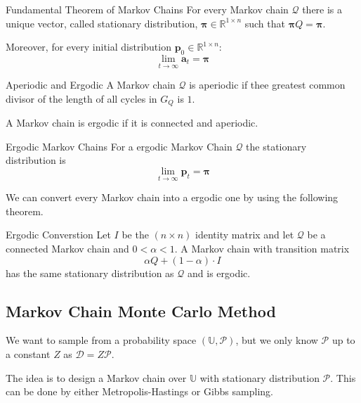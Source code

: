\documentclass{panikzettel}
\begin{document}
\begin{theo}{Fundamental Theorem of Markov Chains}
For every Markov chain $\mathcal{Q}$ there is a unique vector, called stationary distribution, $\boldsymbol{\pi} \in \mathbb{R}^{1 \times n}$ such that $\boldsymbol{\pi} Q = \boldsymbol{\pi}$.

Moreover, for every initial distribution $\textbf{p}_0 \in \mathbb{R}^{1 \times n}$:
$$
\lim_{t \rightarrow \infty} \textbf{a}_t = \boldsymbol{\pi}
$$
\end{theo}


\begin{defi}{Aperiodic and Ergodic}
A Markov chain $\mathcal{Q}$ is aperiodic if thee greatest common divisor of the length of all cycles in $G_Q$ is $1$.

A Markov chain is ergodic if it is connected and aperiodic.
\end{defi}

\begin{theo}{Ergodic Markov Chains}
For a ergodic Markov Chain $\mathcal{Q}$ the stationary distribution is
$$
\lim_{t \rightarrow \infty} \textbf{p}_t = \boldsymbol{\pi}
$$
\end{theo}

We can convert every Markov chain into a ergodic one by using the following theorem.

\begin{theo}{Ergodic Converstion}
Let $I$ be the $(n\times n)$ identity matrix and let $\mathcal{Q}$ be a connected Markov chain and $0 < \alpha < 1$. A Markov chain with transition matrix
\[
\alpha Q + (1 - \alpha)\cdot I
\]
has the same stationary distribution as $\mathcal{Q}$ and is ergodic.
\end{theo}

\subsection{Markov Chain Monte Carlo Method}
We want to sample from a probability space $(\mathbb{U}, \mathcal{P})$, but we only know $\mathcal{P}$ up to a constant $Z$ as $\mathcal{D} = Z \mathcal{P}$.

The idea is to design a Markov chain over $\mathbb{U}$ with stationary distribution $\mathcal{P}$. This can be done by either Metropolis-Hastings or Gibbs sampling.
\end{document}
